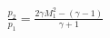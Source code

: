\documentclass[10pt]{article}
\begin{document}
\begin{align*}\frac{p_2}{p_1}=\frac{2 \gamma M_{1}^{2} -  \left(\gamma - 1 \right)}{\gamma+1}\end{align*}
\end{document}

